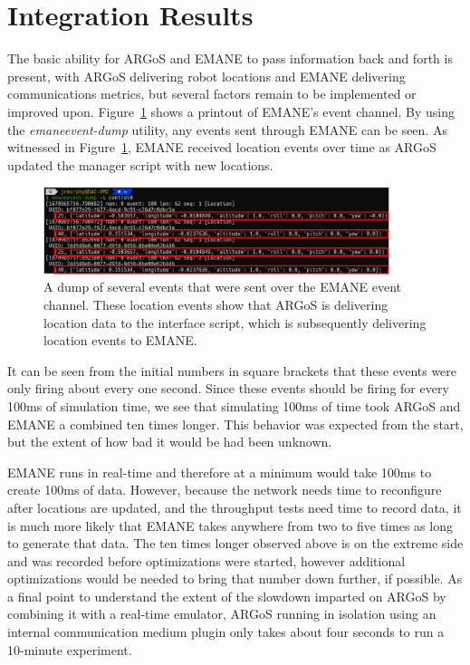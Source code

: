 \section{Integration Results}
The basic ability for ARGoS and EMANE to pass information back and forth is present, with ARGoS delivering robot locations and EMANE delivering communications metrics, but several factors remain to be implemented or improved upon.
Figure~\ref{emane_locs} shows a printout of EMANE's event channel.
By using the \textit{emaneevent-dump} utility, any events sent through EMANE can be seen.
As witnessed in Figure~\ref{emane_locs}, EMANE received location events over time as ARGoS updated the manager script with new locations.
\begin{figure}[!ht]
    \centering
    \includegraphics[width=0.9\textwidth,keepaspectratio]{Images/Chpt5/ARGoS_Events_EMANE_annotated.png}
    \caption{A dump of several events that were sent over the EMANE event channel. These location events show that ARGoS is delivering location data to the interface script, which is subsequently delivering location events to EMANE.}
    \label{emane_locs}
\end{figure}
It can be seen from the initial numbers in square brackets that these events were only firing about every one second.
Since these events should be firing for every 100ms of simulation time, we see that simulating 100ms of time took ARGoS and EMANE a combined ten times longer.
This behavior was expected from the start, but the extent of how bad it would be had been unknown.\par
EMANE runs in real-time and therefore at a minimum would take 100ms to create 100ms of data.
However, because the network needs time to reconfigure after locations are updated, and the throughput tests need time to record data, it is much more likely that EMANE takes anywhere from two to five times as long to generate that data.
The ten times longer observed above is on the extreme side and was recorded before optimizations were started, however additional optimizations would be needed to bring that number down further, if possible.
As a final point to understand the extent of the slowdown imparted on ARGoS by combining it with a real-time emulator, ARGoS running in isolation using an internal communication medium plugin only takes about four seconds to run a 10-minute experiment.
